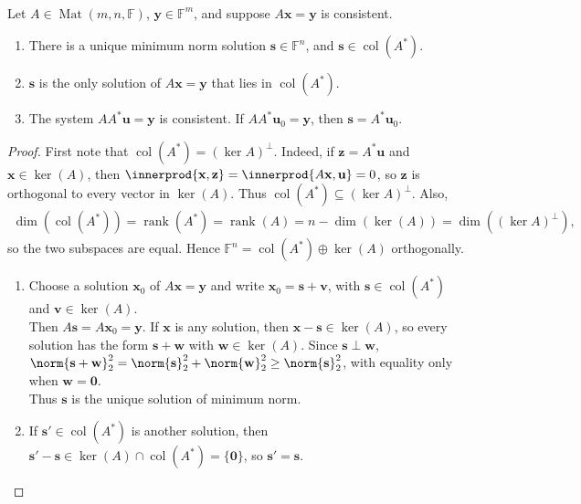 \begin{theorem} \label{thm:minimum-norm-solution-consistent-system} \\
Let $A\in\operatorname{Mat}(m,n,\mathbb{F})$, $\mathbf{y}\in\mathbb{F}^m$, and suppose $A\mathbf{x}=\mathbf{y}$ is consistent.
\begin{enumerate}[label=\roman*.]
\setlength{\itemsep}{0pt}
\item There is a unique minimum norm solution $\mathbf{s}\in\mathbb{F}^n$, and $\mathbf{s}\in\operatorname{col}(A^*)$.
\item $\mathbf{s}$ is the only solution of $A\mathbf{x}=\mathbf{y}$ that lies in $\operatorname{col}(A^*)$.
\item The system $AA^*\mathbf{u}=\mathbf{y}$ is consistent. If $AA^*\mathbf{u}_0=\mathbf{y}$, then $\mathbf{s}=A^*\mathbf{u}_0$.
\end{enumerate}
\begin{proof}
First note that $\operatorname{col}(A^*)=(\ker A)^{\perp}$. Indeed, if $\mathbf{z}=A^*\mathbf{u}$ and $\mathbf{x}\in\ker(A)$, then $\innerprod{\mathbf{x},\mathbf{z}}=\innerprod{A\mathbf{x},\mathbf{u}}=0$, so $\mathbf{z}$ is orthogonal to every vector in $\ker(A)$. Thus $\operatorname{col}(A^*)\subseteq(\ker A)^{\perp}$. Also,
\begin{align}
\dim(\operatorname{col}(A^*))=\operatorname{rank}(A^*)=\operatorname{rank}(A)
=n-\dim(\ker(A))
=\dim((\ker A)^{\perp}), \nonumber
\end{align}
so the two subspaces are equal. Hence $\mathbb{F}^n=\operatorname{col}(A^*)\oplus\ker(A)$ orthogonally.
\begin{enumerate}[label=(\roman*)]
\setlength{\itemsep}{0pt}
\item Choose a solution $\mathbf{x}_0$ of $A\mathbf{x}=\mathbf{y}$ and write $\mathbf{x}_0=\mathbf{s}+\mathbf{v}$, with $\mathbf{s}\in\operatorname{col}(A^*)$ and $\mathbf{v}\in\ker(A)$.\\
Then $A\mathbf{s}=A\mathbf{x}_0=\mathbf{y}$. If $\mathbf{x}$ is any solution, then $\mathbf{x}-\mathbf{s}\in\ker(A)$, so every solution has the form $\mathbf{s}+\mathbf{w}$ with $\mathbf{w}\in\ker(A)$. Since $\mathbf{s}\perp\mathbf{w}$, $\norm{\mathbf{s}+\mathbf{w}}_2^2=\norm{\mathbf{s}}_2^2+\norm{\mathbf{w}}_2^2\geq\norm{\mathbf{s}}_2^2$, with equality only when $\mathbf{w}=\mathbf{0}$.\\
Thus $\mathbf{s}$ is the unique solution of minimum norm.
\item If $\mathbf{s}'\in\operatorname{col}(A^*)$ is another solution, then $\mathbf{s}'-\mathbf{s}\in\ker(A)\cap\operatorname{col}(A^*)=\{\mathbf{0}\}$, so $\mathbf{s}'=\mathbf{s}$.

\end{enumerate}
\end{proof}
\end{theorem}
